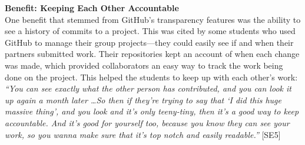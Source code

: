 %




\textbf{Benefit: Keeping Each Other Accountable} \\
One benefit that stemmed from GitHub's transparency features was the ability to see a history of commits to a project. This was cited by some students who used GitHub to manage their group projects---they could easily see if and when their partners submitted work. Their repositories kept an account of when each change was made, which provided collaborators an easy way to track the work being done on the project. This helped the students to keep up with each other's work: \textit{``You can see exactly what the other person has contributed, and you can look it up again a month later \ldots So then if they're trying to say that `I did this huge massive thing', and you look and it's only teeny-tiny, then it's a good way to keep accountable. And it's good for yourself too, because you know they can see your work, so you wanna make sure that it's top notch and easily readable.''} [SE5]

